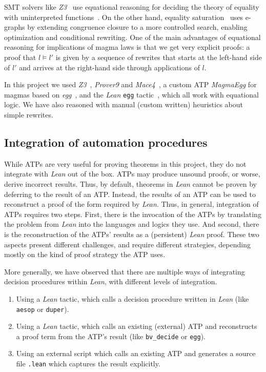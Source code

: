 SMT solvers like \emph{Z3}~\cite{DBLP:conf/tacas/MouraB08} use equational reasoning for deciding the theory of equality with uninterpreted functions~\cite{DBLP:series/txtcs/KroeningS16,DBLP:conf/cade/MouraB07}.
On the other hand, equality saturation~\cite{DBLP:journals/pacmpl/WillseyNWFTP21} uses e-graphs by extending congruence closure to a more controlled search, enabling optimization and conditional rewriting.
One of the main advantages of equational reasoning for implications of magma laws is that we get very explicit proofs: a proof that $l \models l'$ is given by a sequence of rewrites that starts at the left-hand side of $l'$ and arrives at the right-hand side through applications of $l$.

In this project we used \emph{Z3}~\cite{DBLP:conf/tacas/MouraB08}, \emph{Prover9} and \emph{Mace4}~\cite{prover9-mace4}, a custom ATP \emph{MagmaEgg} for magmas based on \emph{egg}~\cite{DBLP:journals/pacmpl/WillseyNWFTP21}, and the \emph{Lean} \texttt{egg} tactic~\cite{DBLP:journals/pacmpl/KoehlerGBGTS24,egg_tactic}, which all work with equational logic. We have also reasoned with manual (custom written) heuristics about simple rewrites.

\subsection{Integration of automation procedures}
\label{sec:proof-reconstruction}

While ATPs are very useful for proving theorems in this project, they do not integrate with \emph{Lean} out of the box.
ATPs may produce unsound proofs, or worse, derive incorrect results.
Thus, by default, theorems in \emph{Lean} cannot be proven by deferring to the result of an ATP\@.
Instead, the results of an ATP can be used to reconstruct a proof of the form required by \emph{Lean}.
Thus, in general, integration of ATPs requires two steps.
First, there is the invocation of the ATPs by translating the problem from \emph{Lean} into the languages and logics they use.
And second, there is the reconstruction of the ATPs' results as a (persistent) \emph{Lean} proof.
These two aspects present different challenges, and require different strategies, depending mostly on the kind of proof strategy the ATP uses.

More generally, we have observed that there are multiple ways of integrating decision procedures within \emph{Lean}, with different levels of integration.

\begin{enumerate}
    \item Using a \emph{Lean} tactic, which calls a decision procedure written in \emph{Lean} (like \texttt{aesop} or \texttt{duper}).
    \item\label{inter} Using a \emph{Lean} tactic, which calls an existing (external) ATP and reconstructs a proof term from the ATP's result (like \texttt{bv\_decide} or \texttt{egg}).
    \item\label{external} Using an external script which calls an existing ATP and generates a source file \texttt{.lean} which captures the result explicitly.
\end{enumerate}

